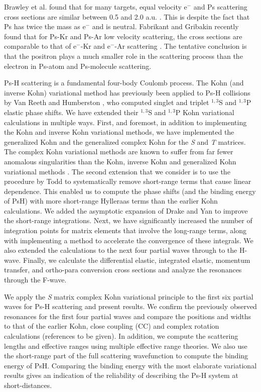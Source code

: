 \documentclass[preprint,showpacs,preprintnumbers,amsmath,amssymb,longbibliography,pra,aps]{revtex4-1}
\begin{document}
Brawley et al. found that for many targets, equal velocity e$^-$ and Ps scattering cross sections are similar between 0.5 and 2.0 a.u. \cite{Brawley2010a,Brawley2010}. This is despite the fact that Ps has twice the mass as e$^-$ and is neutral. Fabrikant and Gribakin recently found that for Ps-Kr and Ps-Ar low velocity scattering, the cross sections are comparable to that of e$^-$-Kr and e$^-$-Ar scattering \cite{Fabrikant2014,Fabrikant2014a}. The tentative conclusion is that the positron plays a much smaller role in the scattering process than the electron in Ps-atom and Ps-molecule scattering.

Ps-H scattering is a fundamental four-body Coulomb process. The Kohn (and inverse Kohn) variational method has previously been applied
to Ps-H collisions by Van Reeth and Humberston \cite{VanReeth2003,VanReeth2004}, who computed singlet and triplet
$^{1,3}$S and $^{1,3}$P elastic phase shifts. 
We have extended their $^{1,3}$S and $^{1,3}$P Kohn variational calculations in multiple ways.
First, and foremost, in addition to implementing
the Kohn and inverse Kohn variational methods, we have
implemented the generalized Kohn and the generalized complex Kohn
for the \emph{S} and \emph{T} matrices. 
The complex Kohn variational methods are known to suffer
from far fewer anomalous singularities than the
Kohn, inverse Kohn and generalized Kohn variational methods \cite{Lucchese1989, Cooper2009, Cooper2010}. 
The second extension that we consider is to use
the procedure by Todd \cite{Todd2007} to systematically remove short-range terms that
cause linear dependence.
This enabled us to compute the phase shifts (and the binding
energy of PsH) with more short-range Hylleraas terms than the earlier 
Kohn calculations. We added the asymptotic expansion of Drake and Yan \cite{Drake1995, Yan1997} to improve the short-range integrations.
Next, we have significantly increased the number of integration points for matrix elements that involve the long-range terms, along with implementing a method to accelerate the convergence of these integrals. We also extended the calculations to the next four partial waves through to the H-wave. Finally, we calculate the differential elastic, integrated elastic, momentum transfer, and ortho-para conversion cross sections and analyze the resonances through the F-wave.

We apply the \emph{S} matrix complex Kohn variational principle to the first six partial waves for Ps-H scattering and present results. We confirm the previously observed resonances for the first four partial waves and compare the positions and widths to that of the earlier Kohn, close coupling (CC) and complex rotation calculations (references to be given). In addition, we compute the scattering lengths and effective ranges using multiple effective range theories. We also use the short-range part of the full scattering wavefunction to compute the binding energy of PsH. Comparing the binding energy with the most elaborate variational results gives an indication of the reliability of describing the Ps-H system at short-distances.
\end{document}
